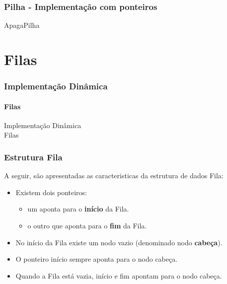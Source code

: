 \documentclass[aspectratio=169]{beamer}
\begin{document}

\begin{frame}
\frametitle{Pilha - Implementação com ponteiros}
\begin{algorithm}[H]
\caption{ApagaPilha} 
\label{ApagaPilha}
\end{algorithm}
\end{frame}


\section{Filas}

\begin{frame}
\frametitle{Implementação Dinâmica}
\framesubtitle{Filas}
\centering
\huge{Implementação Dinâmica\\
Filas
}
\end{frame}

\begin{frame}
\frametitle{Estrutura Fila}
A seguir, são apresentadas as caracteristicas da estrutura de dados Fila:
\begin{itemize}
 \item Existem dois ponteiros:
 \begin{itemize}
    \item um aponta para o {\bf início} da Fila.
    \item o outro que aponta para o {\bf fim} da Fila.
 \end{itemize}
 \item No início da Fila existe um nodo vazio (denominado nodo {\bf cabeça}).
 \item O ponteiro início sempre aponta para o nodo cabeça.
 \item Quando a Fila está vazia, início e fim apontam para o nodo cabeça.
\end{itemize}
\end{frame}
\end{document}

